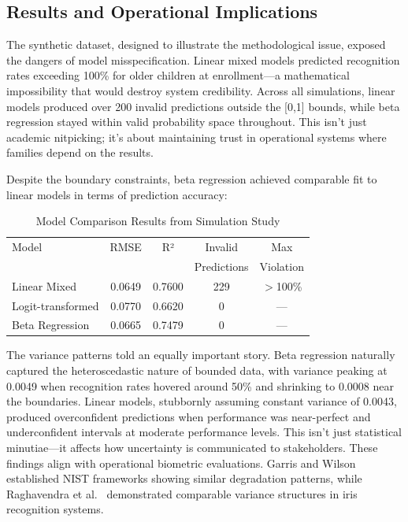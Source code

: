 \documentclass[10pt,journal,compsoc]{IEEEtran}
\begin{document}
\subsection{Results and Operational Implications}

The synthetic dataset, designed to illustrate the methodological issue, exposed the dangers of model misspecification. Linear mixed models predicted recognition rates exceeding 100\% for older children at enrollment---a mathematical impossibility that would destroy system credibility. Across all simulations, linear models produced over 200 invalid predictions outside the [0,1] bounds, while beta regression stayed within valid probability space throughout. This isn't just academic nitpicking; it's about maintaining trust in operational systems where families depend on the results.

Despite the boundary constraints, beta regression achieved comparable fit to linear models in terms of prediction accuracy:

\begin{table}[h]
\centering
\caption{Model Comparison Results from Simulation Study}
\label{tab:model-comparison}
\begin{tabular}{lcccc}
\toprule
Model & RMSE & R² & Invalid & Max \\
 & & & Predictions & Violation \\
\midrule
Linear Mixed & 0.0649 & 0.7600 & 229 & $>$100\% \\
Logit-transformed & 0.0770 & 0.6620 & 0 & --- \\
Beta Regression & 0.0665 & 0.7479 & 0 & --- \\
\bottomrule
\end{tabular}
\end{table}

The variance patterns told an equally important story. Beta regression naturally captured the heteroscedastic nature of bounded data, with variance peaking at 0.0049 when recognition rates hovered around 50\% and shrinking to 0.0008 near the boundaries. Linear models, stubbornly assuming constant variance of 0.0043, produced overconfident predictions when performance was near-perfect and underconfident intervals at moderate performance levels. This isn't just statistical minutiae---it affects how uncertainty is communicated to stakeholders. These findings align with operational biometric evaluations. Garris and Wilson~\cite{garris2005} established NIST frameworks showing similar degradation patterns, while Raghavendra et al.~\cite{raghavendra2015} demonstrated comparable variance structures in iris recognition systems.
\end{document}
